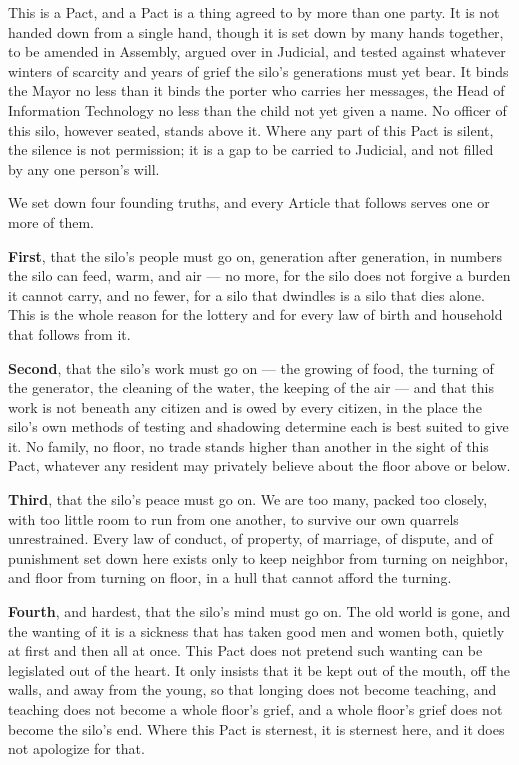 This is a Pact, and a Pact is a thing agreed to by more than one party. It is not handed down from a single hand, though it is set down by many hands together, to be amended in Assembly, argued over in Judicial, and tested against whatever winters of scarcity and years of grief the silo's generations must yet bear. It binds the Mayor no less than it binds the porter who carries her messages, the Head of Information Technology no less than the child not yet given a name. No officer of this silo, however seated, stands above it. Where any part of this Pact is silent, the silence is not permission; it is a gap to be carried to Judicial, and not filled by any one person's will.

We set down four founding truths, and every Article that follows serves one or more of them.

\textbf{First}, that the silo's people must go on, generation after generation, in numbers the silo can feed, warm, and air --- no more, for the silo does not forgive a burden it cannot carry, and no fewer, for a silo that dwindles is a silo that dies alone. This is the whole reason for the lottery and for every law of birth and household that follows from it.

\textbf{Second}, that the silo's work must go on --- the growing of food, the turning of the generator, the cleaning of the water, the keeping of the air --- and that this work is not beneath any citizen and is owed by every citizen, in the place the silo's own methods of testing and shadowing determine each is best suited to give it. No family, no floor, no trade stands higher than another in the sight of this Pact, whatever any resident may privately believe about the floor above or below.

\textbf{Third}, that the silo's peace must go on. We are too many, packed too closely, with too little room to run from one another, to survive our own quarrels unrestrained. Every law of conduct, of property, of marriage, of dispute, and of punishment set down here exists only to keep neighbor from turning on neighbor, and floor from turning on floor, in a hull that cannot afford the turning.

\textbf{Fourth}, and hardest, that the silo's mind must go on. The old world is gone, and the wanting of it is a sickness that has taken good men and women both, quietly at first and then all at once. This Pact does not pretend such wanting can be legislated out of the heart. It only insists that it be kept out of the mouth, off the walls, and away from the young, so that longing does not become teaching, and teaching does not become a whole floor's grief, and a whole floor's grief does not become the silo's end. Where this Pact is sternest, it is sternest here, and it does not apologize for that.

